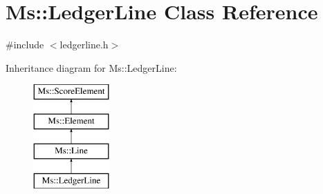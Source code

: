 \hypertarget{class_ms_1_1_ledger_line}{}\section{Ms\+:\+:Ledger\+Line Class Reference}
\label{class_ms_1_1_ledger_line}


{\ttfamily \#include $<$ledgerline.\+h$>$}

Inheritance diagram for Ms\+:\+:Ledger\+Line\+:\begin{figure}[H]
\begin{center}
\leavevmode
\includegraphics[height=4.000000cm]{class_ms_1_1_ledger_line}
\end{center}
\end{figure}
